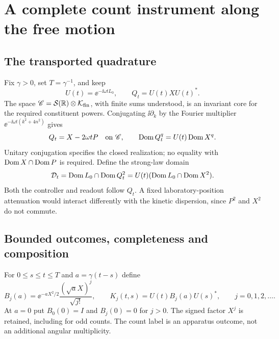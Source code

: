 \section{A complete count instrument along the free motion}\label{sec:instrument}

\subsection{The transported quadrature}
Fix $\gamma>0$, set $T=\gamma^{-1}$, and keep
\begin{equation}\label{eq:Ut}
 U(t)=\ee^{-\ii\omega tL_0},\qquad Q_t=U(t)XU(t)^*.
\end{equation}
The space $\mathscr C=\mathcal S(\mathbb R)\otimes\mathcal K_{\rm fin}$, with finite sums
understood, is an invariant core for the required constituent powers.
Conjugating $\ii\partial_k$ by the Fourier multiplier
$\ee^{-\ii\omega t(k^2+4n^2)}$ gives
\begin{equation}\label{eq:Qt}
 Q_t=X-2\omega tP\quad\hbox{on }\mathscr C,\qquad
 \operatorname{Dom} Q_t^q=U(t)\operatorname{Dom} X^q.
\end{equation}
Unitary conjugation specifies the closed realization; no equality with
$\operatorname{Dom} X\cap\operatorname{Dom} P$ is required. Define the strong-law domain
\begin{equation}\label{eq:Dt}
 \mathcal D_t=\operatorname{Dom} L_0\cap\operatorname{Dom} Q_t^2
             =U(t)(\operatorname{Dom} L_0\cap\operatorname{Dom} X^2).
\end{equation}
Both the controller and readout follow $Q_t$. A fixed laboratory-position
attenuation would interact differently with the kinetic dispersion, since
$P^2$ and $X^2$ do not commute.

\subsection{Bounded outcomes, completeness and composition}
For $0\le s\le t\le T$ and $a=\gamma(t-s)$ define
\begin{equation}\label{eq:K}
 B_j(a)=\ee^{-aX^2/2}\frac{(\sqrt aX)^j}{\sqrt{j!}},\qquad
 K_j(t,s)=U(t)B_j(a)U(s)^*,\qquad j=0,1,2,\ldots.
\end{equation}
At $a=0$ put $B_0(0)=I$ and $B_j(0)=0$ for $j>0$. The signed factor
$X^j$ is retained, including for odd counts. The count label is an apparatus
outcome, not an additional angular multiplicity.

